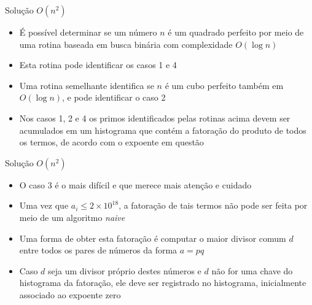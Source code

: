 \begin{frame}[fragile]{Solução $O(n^2)$}

    \begin{itemize}
        \item É possível determinar se um número $n$ é um quadrado perfeito por meio de uma
            rotina baseada em busca binária com complexidade $O(\log n)$

        \item Esta rotina pode identificar os casos 1 e 4

        \item Uma rotina semelhante identifica se $n$ é um cubo perfeito também em $O(\log n)$, e
            pode identificar o caso 2

        \item Nos casos 1, 2 e 4 os primos identificados pelas rotinas acima devem ser acumulados
            em um histograma que contém a fatoração do produto de todos os termos, de acordo com
            o expoente em questão
        
    \end{itemize}

\end{frame}

\begin{frame}[fragile]{Solução $O(n^2)$}

    \begin{itemize}
        \item O caso 3 é o mais difícil e que merece mais atenção e cuidado

        \item Uma vez que $a_i \leq 2\times 10^{18}$, a fatoração de tais termos não pode ser
            feita por meio de um algoritmo \textit{naive}

        \item Uma forma de obter esta fatoração é computar o maior divisor comum $d$ entre todos os
            pares de números da forma $a = pq$

        \item Caso $d$ seja um divisor próprio destes números e $d$ não for uma chave do 
            histograma da fatoração, ele deve ser registrado no histograma, inicialmente 
            associado ao expoente zero
    \end{itemize}

\end{frame}

